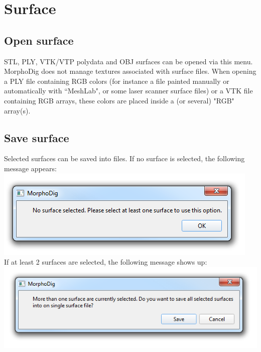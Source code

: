 \section{Surface}
\subsection{Open surface}
STL, PLY,  VTK/VTP polydata and OBJ surfaces can be opened via this menu. MorphoDig does not manage textures associated with surface files. When opening a PLY file containing RGB colors (for instance a file painted manually or automatically with ``MeshLab", or some laser scanner surface files) or a VTK file containing RGB arrays, these colors are placed inside a (or several) "RGB" array(s). 

\subsection{Save surface}
Selected surfaces can be saved into files. If no surface is selected, the following message appears:\\
\includegraphics[scale=0.5]{images/07/surface/no_surface_selected.png}\\
If at least 2 surfaces are selected, the following message shows up:\\
\includegraphics[scale=0.5]{images/07/surface/at_least_2_surfaces_selected.png}

